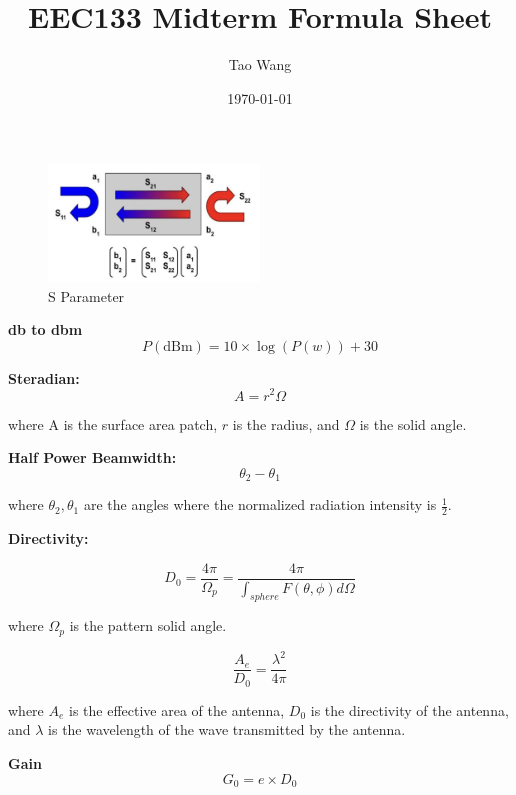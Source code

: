 \documentclass{article} %
\begin{document}
\title{EEC133 Midterm Formula Sheet}
\author{Tao Wang}
\date{\today}

\maketitle

\begin{figure}[H]
    \centering
    \includegraphics[width=0.5\textwidth]{./image/figure1.png}
    \caption{S Parameter}
\end{figure}

\textbf{db to dbm}
\[P(\text{dBm}) = 10 \times \log(P(w)) + 30\]

\textbf{Steradian:}
\[A = r^2 \Omega\]

\begin{center}
    where A is the surface area patch, $r$ is the radius, and $\Omega$ is the solid angle.
\end{center}


\textbf{Half Power Beamwidth:}
\[\theta_2 - \theta_1\]

\begin{center}
    where $\theta_2, \theta_1$ are the angles where the normalized radiation intensity is $\frac{1}{2}$.
\end{center}

\textbf{Directivity:}

\[D_0 = \frac{4 \pi}{\Omega_p} = \frac{4 \pi}{\int_{sphere} F(\theta, \phi) d\Omega}\]

\begin{center}
    where $\Omega_p$ is the pattern solid angle.
\end{center}

\[\frac{A_e}{D_0} = \frac{\lambda^2}{4 \pi}\]

\begin{center}
    where $A_e$ is the effective area of the antenna, $D_0$ is the directivity of the antenna, and $\lambda$ is the wavelength of the wave transmitted by the antenna.
\end{center}

\textbf{Gain}
\[G_0 = e \times D_0\]
\end{document}
